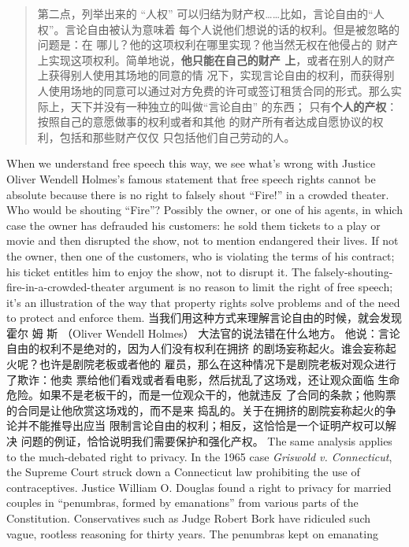 \begin{paracol}{2}
\begin{quotation}
第二点，列举出来的 “人权” 可以归结为财产权……比如，言论自由的“人权”。言论自由被认为意味着
每个人说他们想说的话的权利。但是被忽略的问题是：在
哪儿？他的这项权利在哪里实现？他当然无权在他侵占的
财产上实现这项权利。简单地说，\textbf{他只能在自己的财产
上}，或者在别人的财产上获得别人使用其场地的同意的情
况下，实现言论自由的权利，而获得别人使用场地的同意可以通过对方免费的许可或签订租赁合同的形式。那么实
际上，天下并没有一种独立的叫做“言论自由” 的东西；
只有\textbf{个人的产权}：按照自己的意愿做事的权利或者和其他
的财产所有者达成自愿协议的权利，包括和那些财产仅仅
只包括他们自己劳动的人。	
\end{quotation}
\switchcolumn*
When we understand free speech this way, we see what's wrong
with Justice Oliver Wendell Holmes's famous statement that
free speech rights cannot be absolute because there is no right
to falsely shout ``Fire!'' in a crowded theater. Who would be
shouting ``Fire''? Possibly the owner, or one of his agents, in
which case the owner has defrauded his customers: he sold
them tickets to a play or movie and then disrupted the show,
not to mention endangered their lives. If not the owner, then
one of the customers, who is violating the terms of his contract;
his ticket entitles him to enjoy the show, not to disrupt it. The
falsely-shouting-fire-in-a-crowded-theater argument is no reason to limit the right of free speech; it's an illustration of the
way that property rights solve problems and of the need to protect and enforce them.
\switchcolumn
当我们用这种方式来理解言论自由的时候，就会发现霍尔
姆 斯 （Oliver  Wendell Holmes） 大法官的说法错在什么地方。
他说：言论自由的权利不是绝对的，因为人们没有权利在拥挤
的剧场妄称起火。谁会妄称起火呢？也许是剧院老板或者他的
雇员，那么在这种情况下是剧院老板对观众进行了欺诈：他卖
票给他们看戏或者看电影，然后扰乱了这场戏，还让观众面临
生命危险。如果不是老板干的，而是一位观众干的，他就违反
了合同的条款；他购票的合同是让他欣赏这场戏的，而不是来
捣乱的。关于在拥挤的剧院妄称起火的争论并不能推导出应当
限制言论自由的权利；相反，这恰恰是一个证明产权可以解决
问题的例证，恰恰说明我们需要保护和强化产权。
\switchcolumn*
The same analysis applies to the much-debated right to privacy. In the 1965 case \textit{Griswold v. Connecticut}, the Supreme
Court struck down a Connecticut law prohibiting the use of
contraceptives. Justice William O. Douglas found a right to privacy for married couples in ``penumbras, formed by emanations'' from various parts of the Constitution. Conservatives
such as Judge Robert Bork have ridiculed such vague, rootless
reasoning for thirty years. The penumbras kept on emanating

\end{paracol}
